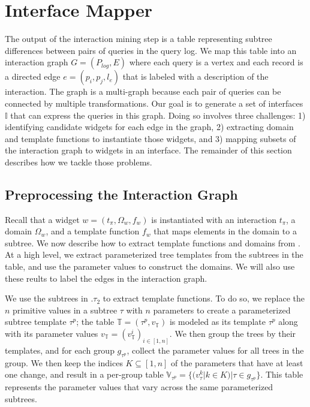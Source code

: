 \section{Interface Mapper}\label{s:interface}


The output of the interaction mining step is a table \diffspil representing subtree differences between pairs of queries in the query log.  We map this table into an interaction graph $G = (P_{log}, E)$  where each query is a vertex and each record is a directed edge $e = (p_i, p_j, l_e)$ that is labeled with a description of the interaction.  The graph is a multi-graph because each pair of queries can be connected by multiple transformations.  Our goal is to generate a set of interfaces $\mathbb{I}$ that can express the queries in this graph.  Doing so involves three challenges: 1) identifying candidate widgets for each edge in the graph, 2) extracting domain and template functions to instantiate those widgets, and 3) mapping subsets of the interaction graph to widgets in an interface. The remainder of this section describes how we tackle those problems.


\subsection{Preprocessing the Interaction Graph}
Recall that a widget $w = (t_\pi, \Omega_w, f_w)$ is instantiated with an interaction $t_\pi$, a domain $\Omega_w$, and a template function $f_w$ that maps elements in the domain to a subtree.  We now describe how to extract template functions and domains from \diffspil.  At a high level, we extract parameterized tree templates from the subtrees in the \diffspil table, and use the parameter values to construct the domains.  We will also use these reults to label the edges in the interaction graph.

  We use the subtrees in \diffspilns$.\tau_2$ to extract template functions.    To do so, we replace the $n$ primitive values in a subtree $\tau$ with $n$ parameters to create a parameterized subtree template $\tau^p$; the table $\mathbb{T} = (\tau^p, v_\mathbb{T})$ is modeled as its template $\tau^p$ along with its parameter values $v_\mathbb{T} = (v_\mathbb{T}^{i})_{i \in [1,n]}$.   We then group the trees by their templates, and for each group $g_{\tau^p}$, collect the parameter values for all trees in the group.  We then keep the indices $K \subseteq [1,n]$ of the parameters that have at least one change, and result in a per-group table $\mathbb{V}_{\tau^p} = \{(v_\tau^k | k \in K) | \tau \in g_{\tau^p} \}$.  This table represents the parameter values that vary across the same parameterized subtrees.

